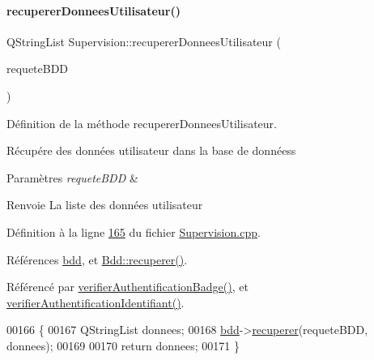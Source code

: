 \paragraph{\texorpdfstring{recuperer\+Donnees\+Utilisateur()}{recupererDonneesUtilisateur()}}
{\footnotesize\ttfamily Q\+String\+List Supervision\+::recuperer\+Donnees\+Utilisateur (\begin{DoxyParamCaption}\item[{Q\+String}]{requete\+B\+DD }\end{DoxyParamCaption})\hspace{0.3cm}{\ttfamily [private]}}



Définition de la méthode recuperer\+Donnees\+Utilisateur. 

Récupére des données utilisateur dans la base de donnéess 
\begin{DoxyParams}{Paramètres}
{\em requete\+B\+DD} & \\
\hline
\end{DoxyParams}
\begin{DoxyReturn}{Renvoie}
La liste des données utilisateur 
\end{DoxyReturn}


Définition à la ligne \hyperlink{_supervision_8cpp_source_l00165}{165} du fichier \hyperlink{_supervision_8cpp_source}{Supervision.\+cpp}.



Références \hyperlink{_supervision_8h_source_l00080}{bdd}, et \hyperlink{_bdd_8cpp_source_l00187}{Bdd\+::recuperer()}.



Référencé par \hyperlink{_supervision_8cpp_source_l00124}{verifier\+Authentification\+Badge()}, et \hyperlink{_supervision_8cpp_source_l00141}{verifier\+Authentification\+Identifiant()}.


\begin{DoxyCode}
00166 \{
00167     QStringList donnees;
00168     \hyperlink{class_supervision_ac9a970d4f511f2eed5da4aed037533ab}{bdd}->\hyperlink{class_bdd_a8f25d29d309041bbf875700db0efd97b}{recuperer}(requeteBDD, donnees);
00169 
00170     \textcolor{keywordflow}{return} donnees;
00171 \}
\end{DoxyCode}
\mbox{\label{class_supervision_a116ed6de0e9e3c9c94886235e9f6d6e8}} 
